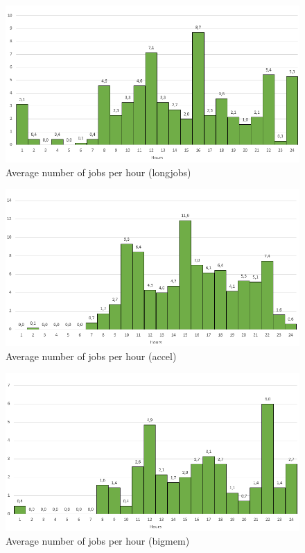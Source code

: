 \documentclass{wscpaperproc}
\begin{document}
\begin{figure}[h!]
\includegraphics[width=\textwidth]{./images/average_arrivals_longjobs}
\caption{Average number of jobs per hour (longjobs)}
\label{arrival_longjobs}
\end{figure}

\begin{figure}[h!]
\includegraphics[width=\textwidth]{./images/average_arrivals_accel}
\caption{Average number of jobs per hour (accel)}
\label{arrival_accel}
\end{figure}

\begin{figure}[h!]
\includegraphics[width=\textwidth]{./images/average_arrivals_bigmem}
\caption{Average number of jobs per hour (bigmem)}
\label{arrival_bigmem}
\end{figure}
\end{document}
